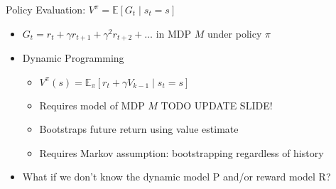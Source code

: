 \documentclass[aspectratio=169]{../latex_main/tntbeamer}  %
\begin{document}
\begin{frame}[c]{Policy Evaluation: $V^\pi = \mathbb{E}[G_t \mid s_t = s]$}

\begin{itemize}
	\item $G_t = r_t + \gamma r_{t+1} + \gamma^2 r_{t+2} + \ldots$ in MDP $M$ under policy $\pi$
	\item Dynamic Programming
	\begin{itemize}
		\item $V^\pi (s)  = \mathbb{E}_\pi [r_t + \gamma V_{k-1} \mid s_t = s]$
		\item \alert{Requires model of MDP $M$} TODO UPDATE SLIDE!
		\item Bootstraps future return using value estimate
		\item Requires Markov assumption: bootstrapping regardless of history
	\end{itemize}
	\pause
	\medskip
	\item What if we don't know the dynamic model P and/or reward model R? 
\end{itemize}

\end{frame}
\end{document}
